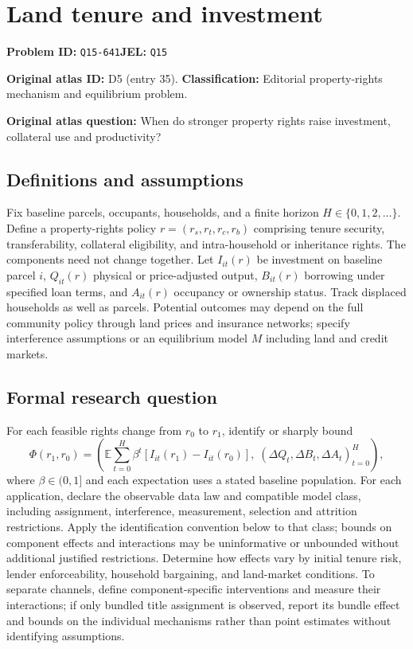 \documentclass[11pt,a4paper]{article}
\begin{document}
\section*{Land tenure and investment}
\textbf{Problem ID:} \texttt{Q15-641}\quad \textbf{JEL:} \texttt{Q15}\par
\label{problem:OP-0035}
\label{atlas:prob:D5}
\noindent\textbf{Original atlas ID:} D5 (entry 35). \textbf{Classification:} Editorial property-rights mechanism and equilibrium problem.

\noindent\textbf{Original atlas question:} When do stronger property rights raise investment, collateral use and productivity?

\subsection*{Definitions and assumptions}
Fix baseline parcels, occupants, households, and a finite horizon $H\in\{0,1,2,\ldots\}$. Define a property-rights policy $r=(r_s,r_t,r_c,r_b)$ comprising tenure security, transferability, collateral eligibility, and intra-household or inheritance rights. The components need not change together. Let $I_{it}(r)$ be investment on baseline parcel $i$, $Q_{it}(r)$ physical or price-adjusted output, $B_{it}(r)$ borrowing under specified loan terms, and $A_{it}(r)$ occupancy or ownership status. Track displaced households as well as parcels. Potential outcomes may depend on the full community policy through land prices and insurance networks; specify interference assumptions or an equilibrium model $M$ including land and credit markets.
\subsection*{Formal research question}
For each feasible rights change from $r_0$ to $r_1$, identify or sharply bound
\[
 \Phi(r_1,r_0)=\left(
 \mathbb E\sum_{t=0}^H\beta^t[I_{it}(r_1)-I_{it}(r_0)],\;
 (\Delta Q_t,\Delta B_t,\Delta A_t)_{t=0}^H\right),
\]
where $\beta\in(0,1]$ and each expectation uses a stated baseline population. For each application, declare the observable data law and compatible model class, including assignment, interference, measurement, selection and attrition restrictions. Apply the identification convention below to that class; bounds on component effects and interactions may be uninformative or unbounded without additional justified restrictions. Determine how effects vary by initial tenure risk, lender enforceability, household bargaining, and land-market conditions. To separate channels, define component-specific interventions and measure their interactions; if only bundled title assignment is observed, report its bundle effect and bounds on the individual mechanisms rather than point estimates without identifying assumptions.
\end{document}
